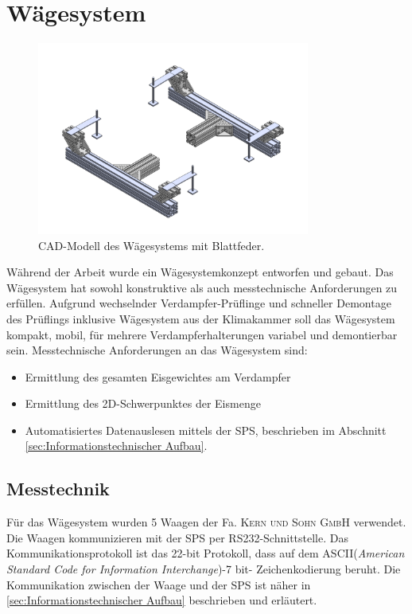\newpage
\section{Wägesystem}
\label{sec:Waegesystem}

\begin{figure}[htb]
\centering		\includegraphics[width=0.80\textwidth]{Pictures/Waage_2Ansichten.pdf}
\caption{CAD-Modell des Wägesystems mit Blattfeder.}
\label{fig:}
\end{figure}

Während der Arbeit wurde ein Wägesystemkonzept entworfen und gebaut. Das Wägesystem hat sowohl konstruktive als auch messtechnische Anforderungen zu erfüllen. Aufgrund wechselnder Verdampfer-Prüflinge und schneller Demontage des Prüflings inklusive Wägesystem aus der Klimakammer soll das Wägesystem  kompakt, mobil, für mehrere Verdampferhalterungen variabel und demontierbar sein. 
Messtechnische Anforderungen an das Wägesystem sind:

\begin{itemize}
\item Ermittlung des gesamten Eisgewichtes am Verdampfer
\item Ermittlung des 2D-Schwerpunktes der Eismenge
\item Automatisiertes Datenauslesen mittels der SPS, beschrieben im Abschnitt \ref{sec:Informationstechnischer Aufbau}.
\end{itemize}

\subsection{Messtechnik}
\label{subsec:Waagen-Messtechnik}

Für das Wägesystem wurden 5 Waagen der Fa. \textsc{Kern und Sohn GmbH} verwendet. Die Waagen kommunizieren mit der SPS per RS232-Schnittstelle. Das Kommunikationsprotokoll ist das 22-bit Protokoll, dass auf dem \textsc{ASCII}(\textit{American Standard Code for Information Interchange})-7 bit- Zeichenkodierung beruht. 
Die Kommunikation zwischen der Waage und der SPS ist näher in \ref{sec:Informationstechnischer Aufbau} beschrieben und erläutert.

